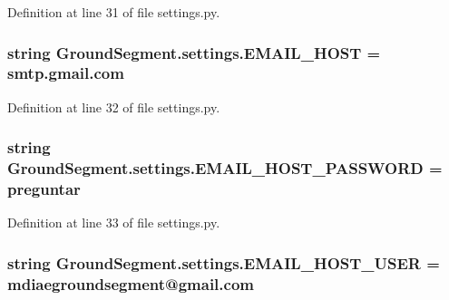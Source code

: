 Definition at line 31 of file settings.\+py.

\hypertarget{namespace_ground_segment_1_1settings_a543f885a8ff97df8e4e3c215d0ef42a8}{}
\subsubsection[{E\+M\+A\+I\+L\+\_\+\+H\+O\+S\+T}]{\setlength{\rightskip}{0pt plus 5cm}string Ground\+Segment.\+settings.\+E\+M\+A\+I\+L\+\_\+\+H\+O\+S\+T = \textquotesingle{}smtp.\+gmail.\+com\textquotesingle{}}\label{namespace_ground_segment_1_1settings_a543f885a8ff97df8e4e3c215d0ef42a8}


Definition at line 32 of file settings.\+py.

\hypertarget{namespace_ground_segment_1_1settings_aedd7c143f3020b0a1156e678dc353726}{}
\subsubsection[{E\+M\+A\+I\+L\+\_\+\+H\+O\+S\+T\+\_\+\+P\+A\+S\+S\+W\+O\+R\+D}]{\setlength{\rightskip}{0pt plus 5cm}string Ground\+Segment.\+settings.\+E\+M\+A\+I\+L\+\_\+\+H\+O\+S\+T\+\_\+\+P\+A\+S\+S\+W\+O\+R\+D = \textquotesingle{}preguntar\textquotesingle{}}\label{namespace_ground_segment_1_1settings_aedd7c143f3020b0a1156e678dc353726}


Definition at line 33 of file settings.\+py.

\hypertarget{namespace_ground_segment_1_1settings_a0bc4395f3eefc35a5ad7741002256650}{}
\subsubsection[{E\+M\+A\+I\+L\+\_\+\+H\+O\+S\+T\+\_\+\+U\+S\+E\+R}]{\setlength{\rightskip}{0pt plus 5cm}string Ground\+Segment.\+settings.\+E\+M\+A\+I\+L\+\_\+\+H\+O\+S\+T\+\_\+\+U\+S\+E\+R = \textquotesingle{}mdiaegroundsegment@gmail.\+com\textquotesingle{}}\label{namespace_ground_segment_1_1settings_a0bc4395f3eefc35a5ad7741002256650}


